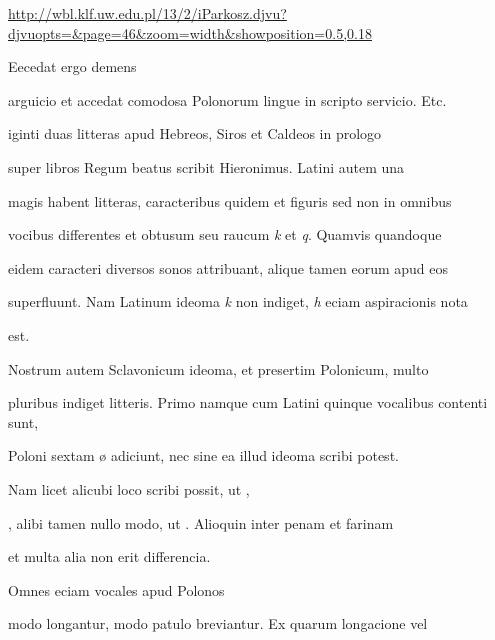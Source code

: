 
\newpage
\newParkoszpage

\url{http://wbl.klf.uw.edu.pl/13/2/iParkosz.djvu?djvuopts=&page=46&zoom=width&showposition=0.5,0.18}

\fullpreviouslines


{
\color{blue}

Eecedat ergo demens 

}



\fulllines{}

arguicio et accedat comodosa Polonorum lingue in scripto servicio. Etc.

iginti duas litteras apud Hebreos, Siros et Caldeos in prologo

super libros Regum beatus scribit Hieronimus. Latini autem una

magis habent litteras, caracteribus quidem et figuris sed non in omnibus

vocibus differentes et obtusum seu raucum \textit{k} et \textit{q}. Quamvis quandoque

eidem caracteri diversos sonos attribuant, alique tamen eorum apud eos

superfluunt. Nam Latinum ideoma \textit{k} non indiget, \textit{h} eciam aspiracionis nota

\splitlines{}

est.

\indentK Nostrum autem Sclavonicum ideoma, et presertim Polonicum, multo

\fulllines{}

pluribus indiget litteris. Primo namque cum Latini quinque vocalibus contenti sunt,

Poloni  sextam ø adiciunt, nec sine ea illud ideoma scribi potest.

Nam licet alicubi loco   scribi possit, ut  , 

, alibi tamen nullo modo, ut  . Alioquin inter penam et farinam

\splitlines{}

et multa alia non erit differencia.

\indentK Omnes eciam vocales apud Polonos

\fulllines{}

modo longantur, modo patulo breviantur. Ex quarum longacione vel 

